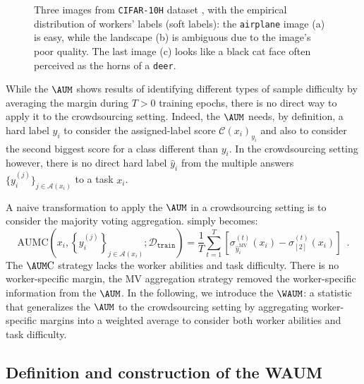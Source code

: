 \begin{figure}[thb]
\begin{minipage}{.3\linewidth}
    \end{minipage}
    \caption{Three images from \texttt{CIFAR-10H} dataset \citep{peterson_human_2019}, with the empirical distribution of workers' labels (soft labels): the \texttt{airplane} image (a) is easy, while the landscape (b) is ambiguous due to the image's poor quality. The last image (c) looks like a black cat face often perceived as the horns of a \texttt{deer}.}
    \label{fig:votes-c10h}
    \end{figure}

While the $\AUM$ shows results of identifying different types of sample difficulty by averaging the margin during $T>0$ training epochs, there is no direct way to apply it to the crowdsourcing setting.
Indeed, the $\AUM$ needs, by definition, a hard label $y_i$ to consider the assigned-label score $\mathcal{C}(x_i)_{y_i}$ and also to consider the second biggest score for a class different than $y_i$.
In the crowdsourcing setting however, there is no direct hard label $\hat y_i$ from the multiple answers $\{y_i^{(j)}\}_{j\in\mathcal{A}(x_i)}$ to a task $x_i$.


A naive transformation to apply the $\AUM$ in a crowdsourcing setting is to consider the majority voting aggregation.  simply becomes:
\begin{equation}\label{eq:aum_mv}
    \mathrm{AUMC}\left(x_i,\left\{y_i^{(j)}\right\}_{j\in\mathcal{A}(x_i)};\mathcal{D}_\texttt{train}\right) = \frac{1}{T}\sum_{t=1}^T \left[\sigma_{\hat y_i^{\mathrm{MV}}}^{(t)}(x_i) - \sigma_{[2]}^{(t)}(x_i)\right] \enspace.
\end{equation}
The $\AUM\mathrm{C}$ strategy lacks the worker abilities and task difficulty.
There is no worker-specific margin, the MV aggregation strategy removed the worker-specific information from the $\AUM$.
In the following, we introduce the $\WAUM$: a statistic that generalizes the $\AUM$ to the crowdsourcing setting by aggregating worker-specific margins into a weighted average to consider both worker abilities and task difficulty.

\subsection{Definition and construction of the WAUM}
\label{sub:def_waum}

